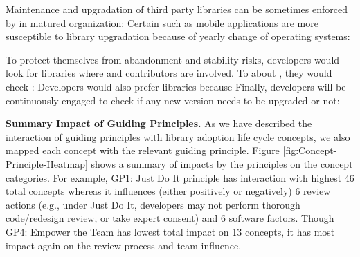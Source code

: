 Maintenance and upgradation of third party libraries can be sometimes enforced by  in matured organization:  Certain  such as mobile applications are more susceptible to library upgradation because of yearly change of operating systems: 

To protect themselves from abandonment and stability risks, developers would look for libraries where  and contributors are involved. To  about , they would check :  Developers would also prefer libraries  because  Finally, developers will be continuously engaged to check if any new version needs to be upgraded or not: 

\textbf{Summary Impact of Guiding Principles.} As we have described the interaction of guiding principles with library adoption life cycle concepts, we also mapped each concept with the relevant guiding principle. Figure \ref{fig:Concept-Principle-Heatmap} shows a summary of impacts by the principles on the concept categories. For example, GP1: Just Do It principle has interaction with highest 46 total concepts whereas it influences (either positively or negatively) 6 review actions (e.g., under Just Do It, developers may not perform thorough code/redesign review, or take expert consent) and 6 software factors. Though GP4: Empower the Team has lowest total impact on 13 concepts, it has most impact again on the review process and team influence.

